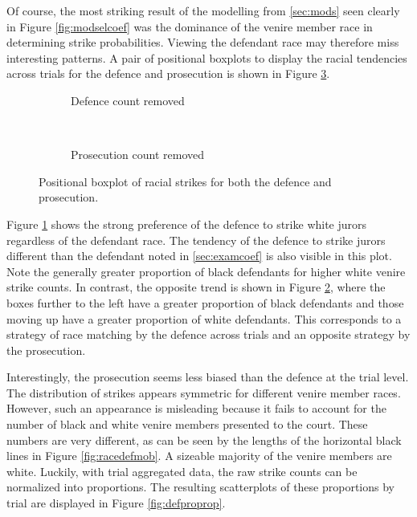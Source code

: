 Of course, the most striking result of the modelling from \ref{sec:mods} seen clearly in Figure \ref{fig:modselcoef} was the
dominance of the venire member race in determining strike
probabilities. Viewing the defendant race may therefore miss
interesting patterns. A pair of positional boxplots to display the
racial tendencies across trials for the defence and prosecution is
shown in Figure \ref{fig:defandpros}.

\begin{figure}[h!]
  \centering
  \begin{subfigure}{0.7\textwidth}
    \caption{\footnotesize Defence count removed}
    \label{fig:defracestrike}
  \end{subfigure}
  ~
  \begin{subfigure}{0.7\textwidth}
    \caption{\footnotesize Prosecution count removed}
    \label{fig:proracestrike}
  \end{subfigure}
  \caption[Racial Strike Counts by Party]
  {\footnotesize Positional boxplot of racial strikes for both the defence and prosecution.}
  \label{fig:defandpros}
\end{figure}

Figure \ref{fig:defracestrike} shows the strong preference of the defence to strike white jurors regardless of the defendant
race. The tendency of the defence to strike jurors different than the defendant noted in \ref{sec:examcoef} is also visible in
this plot. Note the generally greater proportion of black defendants for higher white venire strike
counts. In contrast, the opposite trend is shown in Figure \ref{fig:proracestrike}, where the boxes further to the left have a
greater proportion of black defendants and those moving up have a
greater proportion of white defendants. This corresponds to a strategy
of race matching by the defence across trials and an opposite strategy
by the prosecution.

Interestingly, the prosecution seems less biased than the defence at
the trial level. The distribution of strikes appears symmetric for
different venire member races. However, such an appearance is misleading because it fails to account for
the number of black and white venire members presented to the court. These numbers are very different, as can be seen by the
lengths of the horizontal black lines in Figure \ref{fig:racedefmob}. A sizeable majority of the venire members are
white. Luckily, with trial aggregated data, the raw strike counts can be normalized into proportions. The resulting scatterplots
of these proportions by trial are displayed in Figure \ref{fig:defproprop}.

